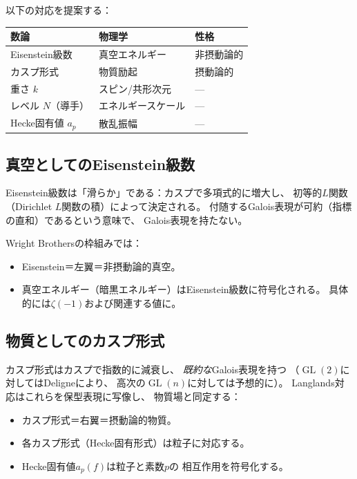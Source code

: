 \documentclass[12pt,a4paper]{article}
\theoremstyle{definition}
\newcommand{\GL}{\operatorname{GL}}
\begin{document}
以下の対応を提案する：

\begin{center}
\begin{tabular}{lll}
\toprule
数論 & 物理学 & 性格 \\
\midrule
Eisenstein級数 & 真空エネルギー & 非摂動論的 \\
カスプ形式 & 物質励起 & 摂動論的 \\
重さ $k$ & スピン/共形次元 & --- \\
レベル $N$（導手） & エネルギースケール & --- \\
Hecke固有値 $a_p$ & 散乱振幅 & --- \\
\bottomrule
\end{tabular}
\end{center}

\subsection{真空としてのEisenstein級数}

Eisenstein級数は「滑らか」である：カスプで多項式的に増大し、
初等的$L$関数（Dirichlet $L$関数の積）によって決定される。
付随するGalois表現が可約（指標の直和）であるという意味で、
Galois表現を持たない。

Wright Brothersの枠組みでは：
\begin{itemize}
  \item Eisenstein＝左翼＝非摂動論的真空。
  \item 真空エネルギー（暗黒エネルギー）はEisenstein級数に符号化される。
    具体的には$\zeta(-1)$および関連する値に。
\end{itemize}

\subsection{物質としてのカスプ形式}

カスプ形式はカスプで指数的に減衰し、
\emph{既約な}Galois表現を持つ
（$\GL(2)$に対してはDeligneにより、
高次の$\GL(n)$に対しては予想的に）。
Langlands対応はこれらを保型表現に写像し、
物質場と同定する：
\begin{itemize}
  \item カスプ形式＝右翼＝摂動論的物質。
  \item 各カスプ形式（Hecke固有形式）は粒子に対応する。
  \item Hecke固有値$a_p(f)$は粒子と素数$p$の
    相互作用を符号化する。
\end{itemize}
\end{document}
